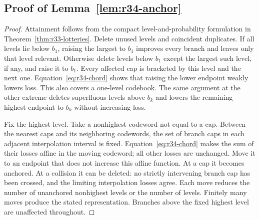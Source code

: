 \subsection{Proof of Lemma~\ref{lem:r34-anchor}}\label{ec-proof-lem-r34-anchor}
\begin{proof}
Attainment follows from the compact level-and-probability formulation in Theorem~\ref{thm:r33-lotteries}. Delete unused levels and coincident duplicates. If all levels lie below $b_1$, raising the largest to $b_1$ improves every branch and leaves only that level relevant. Otherwise delete levels below $b_1$ except the largest such level, if any, and raise it to $b_1$. Every affected cap is bracketed by this level and the next one. Equation~\eqref{eq:r34-chord} shows that raising the lower endpoint weakly lowers loss. This also covers a one-level codebook. The same argument at the other extreme deletes superfluous levels above $b_k$ and lowers the remaining highest endpoint to $b_k$ without increasing loss.

Fix the highest level. Take a nonhighest codeword not equal to a cap. Between the nearest caps and its neighboring codewords, the set of branch caps in each adjacent interpolation interval is fixed. Equation~\eqref{eq:r34-chord} makes the sum of their losses affine in the moving codeword; all other losses are unchanged. Move it to an endpoint that does not increase this affine function. At a cap it becomes anchored. At a collision it can be deleted: no strictly intervening branch cap has been crossed, and the limiting interpolation losses agree. Each move reduces the number of unanchored nonhighest levels or the number of levels. Finitely many moves produce the stated representation. Branches above the fixed highest level are unaffected throughout.\end{proof}
